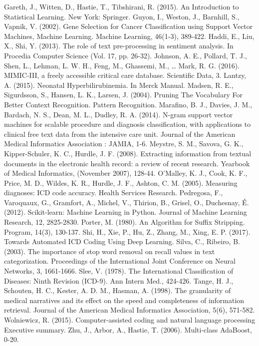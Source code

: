 \documentclass[conference]{IEEEtran}
\begin{document}
\begin{thebibliography}{00}
 Gareth, J., Witten, D., Hastie, T., Tibshirani, R. (2015). An Introduction to Statistical Learning. New York: Springer.
 Guyon, I., Weston, J., Barnhill, S., Vapnik, V. (2002). Gene Selection for Cancer Classification using Support Vector Machines, Machine Learning. Machine Learning, 46(1-3), 389-422.
 Haddi, E., Liu, X., Shi, Y. (2013). The role of text pre-processing in sentiment analysis. In Procedia Computer Science (Vol. 17, pp. 26-32).
 Johnson, A. E., Pollard, T. J., Shen, L., Lehman, L. W. H., Feng, M., Ghassemi, M., … Mark, R. G. (2016). MIMIC-III, a freely accessible critical care database. Scientific Data, 3.
 Lantzy, A. (2015). Neonatal Hyperbilirubinemia. In Merck Manual.
 Madsen, R. E., Sigurdsson, S., Hansen, L. K., Larsen, J. (2004). Pruning The Vocabulary For Better Context Recognition. Pattern Recognition.
 Marafino, B. J., Davies, J. M., Bardach, N. S., Dean, M. L., Dudley, R. A. (2014). N-gram support vector machines for scalable procedure and diagnosis classification, with applications to clinical free text data from the intensive care unit. Journal of the American Medical Informatics Association : JAMIA, 1-6.
 Meystre, S. M., Savova, G. K., Kipper-Schuler, K. C., Hurdle, J. F. (2008). Extracting information from textual documents in the electronic health record: a review of recent research. Yearbook of Medical Informatics, (November 2007), 128-44.
 O’Malley, K. J., Cook, K. F., Price, M. D., Wildes, K. R., Hurdle, J. F., Ashton, C. M. (2005). Measuring diagnoses: ICD code accuracy. Health Services Research.
 Pedregosa, F., Varoquaux, G., Gramfort, A., Michel, V., Thirion, B., Grisel, O., Duchesnay, É. (2012). Scikit-learn: Machine Learning in Python. Journal of Machine Learning Research, 12, 2825-2830.
 Porter, M. (1980). An Algorithm for Suffix Stripping. Program, 14(3), 130-137.
 Shi, H., Xie, P., Hu, Z., Zhang, M., Xing, E. P. (2017). Towards Automated ICD Coding Using Deep Learning.
 Silva, C., Ribeiro, B. (2003). The importance of stop word removal on recall values in text categorization. Proceedings of the International Joint Conference on Neural Networks, 3, 1661-1666.
 Slee, V. (1978). The International Classification of Diseases: Ninth Revision (ICD-9). Ann Intern Med., 424-426.
 Tange, H. J., Schouten, H. C., Kester, A. D. M., Hasman, A. (1998). The granularity of medical narratives and its effect on the speed and completeness of information retrieval. Journal of the American Medical Informatics Association, 5(6), 571-582.
 Wolniewicz, R. (2015). Computer-assisted coding and natural language processing Executive summary.
 Zhu, J., Arbor, A., Hastie, T. (2006). Multi-class AdaBoost, 0-20.

\end{thebibliography}
\end{document}
